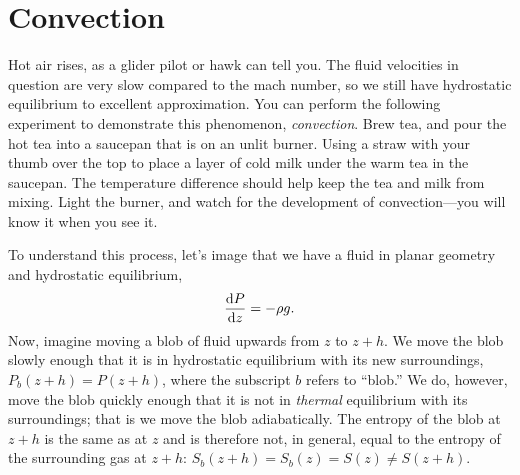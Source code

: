 \chapter{Convection}\label{s.convection}
\newcommand{\TPstar}{\left.\frac{\dif T}{\dif P}\right|_{\star}}

Hot air rises, as a glider pilot or hawk can tell you. The fluid velocities in question are very slow compared to the mach number, so we still have hydrostatic equilibrium to excellent approximation. You can perform the following experiment to demonstrate this phenomenon, \emph{convection}.  Brew tea, and pour the hot tea into a saucepan that is on an unlit burner.  Using a straw with your thumb over the top to place a layer of cold milk under the warm tea in the saucepan.  The temperature difference should help keep the tea and milk from mixing.   Light the burner, and watch for the development of convection---you will know it when you see it.

To understand this process, let's image that we have a fluid in planar geometry and hydrostatic equilibrium,
\begin{equation}
\frac{\mathrm{d} P}{\mathrm{d} z} = -\rho g.
\end{equation}
Now, imagine moving a blob of fluid upwards from $z$ to $z+h$.  We move the blob slowly enough that it is in hydrostatic equilibrium with its new surroundings, $P_{b}(z+h) = P(z+h)$, where the subscript $b$ refers to ``blob.'' We do, however, move the blob quickly enough that it is not in \emph{thermal} equilibrium with its surroundings; that is we move the blob adiabatically.  The entropy of the blob at $z+h$ is the same as at $z$ and is therefore not, in general, equal to the entropy of the surrounding gas at $z+h$: $S_{b}(z+h) = S_{b}(z) = S(z) \neq S(z+h)$.  

